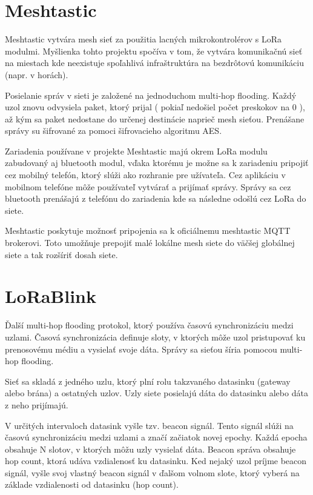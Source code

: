 \documentclass[slovak,master]{diploma}
\begin{document}
\section{Meshtastic}
Meshtastic vytvára mesh sieť za použitia lacných mikrokontrolérov s LoRa modulmi.
Myšlienka tohto projektu spočíva v tom, že vytvára komunikačnú sieť na miestach kde neexistuje spoľahlivá infraštruktúra na bezdrôtovú komunikáciu (napr. v horách).

Posielanie správ v sieti je založené na jednoduchom multi-hop flooding.
Každý uzol znovu odvysiela paket, ktorý prijal ( pokiaľ nedošiel počet preskokov na 0 ), až kým sa paket nedostane do určenej destinácie naprieč mesh sieťou.
Prenášane správy su šifrované za pomoci šifrovacieho algoritmu AES.

Zariadenia používane v projekte Meshtastic majú okrem LoRa modulu zabudovaný aj bluetooth modul, vďaka ktorému je možne sa k zariadeniu pripojiť cez mobilný telefón, ktorý slúži ako rozhranie pre 
užívateľa. Cez aplikáciu v mobilnom telefóne môže používateľ vytvárať a prijímať správy. Správy sa cez bluetooth prenášajú z telefónu do zariadenia kde sa následne odošlú cez 
LoRa do siete.

Meshtastic poskytuje možnosť pripojenia sa k oficiálnemu meshtastic MQTT brokerovi. Toto umožňuje prepojiť malé lokálne mesh siete do väčšej globálnej siete a 
tak rozšíriť dosah siete.

\section{LoRaBlink}
Ďalší multi-hop flooding protokol, ktorý používa časovú synchronizáciu medzi uzlami. Časová synchronizácia definuje sloty, v ktorých môže uzol pristupovať ku prenosovému médiu a 
vysielať svoje dáta. Správy sa sieťou šíria pomocou multi-hop flooding.

Sieť sa skladá z jedného uzlu, ktorý plní rolu takzvaného datasinku (gateway alebo brána) a ostatných uzlov. Uzly siete posielajú dáta do datasinku alebo dáta z neho prijímajú.

V určitých intervaloch datasink vyšle tzv. beacon signál. Tento signál slúži na časovú synchronizáciu medzi uzlami a značí začiatok novej epochy. 
Každá epocha obsahuje N slotov, v ktorých môžu uzly vysielať dáta. Beacon správa obsahuje hop count, ktorá udáva vzdialenosť ku datasinku.
Ked nejaký uzol príjme beacon signál, vyšle svoj vlastný beacon signál v ďalšom volnom slote, ktorý vyberá na základe vzdialenosti od datasinku (hop count).
\end{document}
